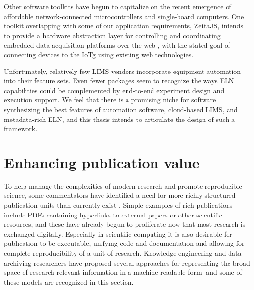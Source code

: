 \documentclass[../thesis]{subfiles}
\begin{document}
Other software toolkits have begun to capitalize on
the recent emergence of affordable network-connected microcontrollers
and single-board computers. One toolkit overlapping with some
of our application requirements, ZettaJS, intends to provide a
hardware abstraction layer for controlling and coordinating embedded
data acquisition platforms over the web \cite{ZettaJS}, with the
stated goal of connecting devices to the \gls{IoTg} using existing web
technologies.

Unfortunately, relatively few \gls{LIMS} vendors incorporate equipment
automation into their feature sets. Even fewer packages seem to
recognize the ways \gls{ELN} capabilities could be complemented by
end-to-end experiment design and execution support. We feel that there
is a promising niche for software synthesizing the best features of
automation software, cloud-based \gls{LIMS}, and metadata-rich
\gls{ELN}, and this thesis intends to articulate the design of such a
framework.



\section{Enhancing publication value}
To help manage the complexities of modern research and promote
reproducible science, some commentators have identified a need for
more richly structured publication units than currently exist
\cite{bechhofer2010research}. Simple examples of rich publications
include PDFs containing hyperlinks to external papers or other
scientific resources, and these have already begun to proliferate now
that most research is exchanged digitally. Especially in scientific
computing it is also desirable for publication to be executable,
unifying code and documentation and allowing for complete
reproducibility of a unit of research. Knowledge
engineering and data archiving researchers have proposed several
approaches for representing the broad space of research-relevant
information in a machine-readable form, and some of these models are
recognized in this section.
\end{document}
